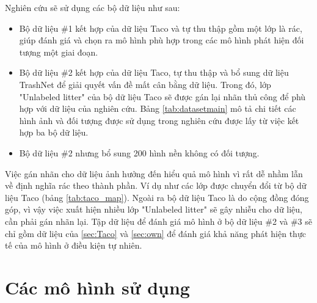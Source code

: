 \documentclass[../the.tex]{subfiles}
\begin{document}
{\fontsize{13}{12} \selectfont
Nghiên cứu sẽ sử dụng các bộ dữ liệu như sau:

\begin{itemize}
	\item Bộ dữ liệu \#1 kết hợp của dữ liệu Taco và tự thu thập gồm một lớp là rác, giúp đánh giá và chọn ra mô hình phù hợp trong các mô hình phát hiện đối tượng một giai đoạn.
	\item Bộ dữ liệu \#2 kết hợp của dữ liệu Taco, tự thu thập và bổ sung dữ liệu TrashNet để giải quyết vấn đề mất cân bằng dữ liệu. 
	Trong đó, lớp "Unlabeled litter" của bộ dữ liệu Taco sẽ được gán lại nhãn thủ công để phù hợp với dữ liệu của nghiên cứu. Bảng \ref{tab:datasetmain} mô tả chi tiết các hình ảnh và đối tượng được sử dụng trong nghiên cứu được lấy từ việc kết hợp ba bộ dữ liệu.\label{item:dataset}
	\item Bộ dữ liệu \#2 nhưng bổ sung 200 hình nền không có đối tượng.
\end{itemize}

Việc gán nhãn cho dữ liệu ảnh hưởng đến hiểu quả mô hình vì rất dễ nhầm lẫn về định nghĩa rác theo thành phần. Ví dụ như các lớp được chuyển đổi từ bộ dữ liệu Taco (bảng \ref{tab:taco_map}).
Ngoài ra bộ dữ liệu Taco là do cộng đồng đóng góp, vì vậy việc xuất hiện nhiều lớp "Unlabeled litter" sẽ gây nhiễu cho dữ liệu, cần phải gán nhãn lại.
Tập dữ liệu để đánh giá mô hình ở bộ dữ liệu \#2 và \#3 sẽ chỉ gồm dữ liệu của \ref{sec:Taco} và \ref{sec:own} để đánh giá khả năng phát hiện thực tế của mô hình ở điều kiện tự nhiên.
}


\section{Các mô hình sử dụng}
\label{sec:model} 
\end{document}
